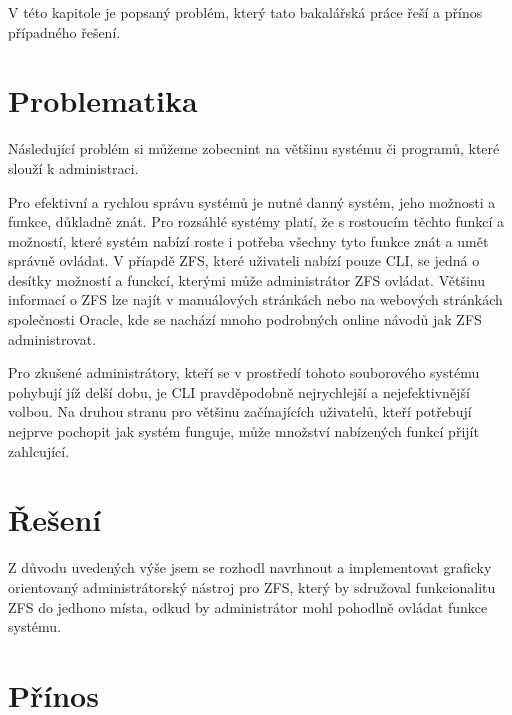 V této kapitole je popsaný problém, který tato bakalářská práce řeší a přínos případného řešení.

\section{Problematika}
Následující problém si můžeme zobecnint na většinu systému či programů, které slouží k administraci.

Pro efektivní a rychlou správu systémů je nutné danný systém, jeho možnosti a funkce, důkladně znát. Pro rozsáhlé systémy platí, že 
s rostoucím těchto funkcí a možností, které systém nabízí roste i potřeba všechny tyto funkce znát a umět správně ovládat.
V příapdě ZFS, které uživateli nabízí pouze CLI, se jedná o desítky možností a funckcí, kterými může administrátor ZFS ovládat.
Většinu informací o ZFS lze najít v manuálových stránkách nebo na webových stránkách společnosti Oracle, kde se nachází mnoho
podrobných online návodů jak ZFS administrovat. 

Pro zkušené administrátory, kteří se v prostředí tohoto souborového systému
pohybují jíž delší dobu, je CLI pravděpodobně nejrychlejší a nejefektivnější volbou. Na druhou stranu pro většinu začínajících uživatelů,
kteří potřebují nejprve pochopit jak systém funguje, může množství nabízených funkcí přijít zahlcující. 
\section{Řešení}
Z důvodu uvedených výše jsem se rozhodl navrhnout a implementovat graficky orientovaný administrátorský nástroj pro ZFS,
který by sdružoval funkcionalitu ZFS do jedhono místa, odkud by administrátor mohl pohodlně ovládat funkce systému. 
\section{Přínos}
